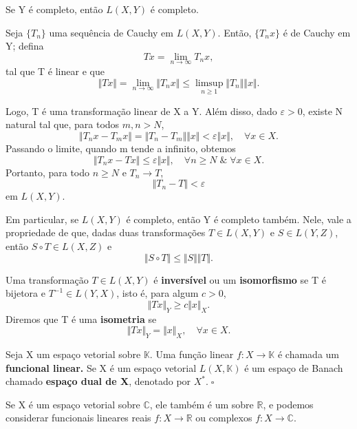 \documentclass[../functional_analysis.tex]{subfiles}
\begin{document}
\begin{prop*}
  Se Y é completo, então \(L(X, Y)\) é completo. 
\end{prop*}
\begin{proof*}
  Seja \(\{T_{n}\}\) uma sequência de Cauchy em \(L(X, Y)\). Então, \(\{T_{n}x\}\) é de Cauchy em Y; defina 
    \[
      Tx = \lim_{n\to \infty}T_{n}x,
    \]
    tal que T é linear e que 
      \[
        \Vert Tx \Vert=\lim_{n\to \infty}\Vert T_{n}x \Vert \leq \limsup_{n\geq 1}\Vert T_{n} \Vert \Vert x \Vert.
      \]

      Logo, T é uma transformação linear de X a Y. Além disso, dado \(\varepsilon >0\), existe N natural tal que, para todos \(m,n>N\), 
        \[
          \Vert T_{n}x - T_{m}x \Vert = \Vert T_{n}-T_{m} \Vert \Vert x \Vert < \varepsilon \Vert x \Vert,\quad \forall x\in X.
        \]
        Passando o limite, quando m tende a infinito, obtemos 
          \[
            \Vert T_{n}x - Tx \Vert \leq \varepsilon \Vert x \Vert,\quad \forall n\geq N\;\&\; \forall x\in X.
          \]
          Portanto, para todo \(n\geq N\) e \(T_{n}\rightarrow T\),
            \[
              \Vert T_{n}-T \Vert<\varepsilon 
            \]
            em \(L(X, Y)\). \qedsymbol
\end{proof*}
  Em particular, se \(L(X, Y)\) é completo, então Y é completo também. Nele, vale a propriedade de que, dadas duas transformações \(T\in L(X,Y)\) e \(S\in L(Y, Z)\), então \(S\circ T\in L(X, Z)\) e 
    \[
      \Vert S\circ T \Vert\leq \Vert S \Vert \Vert T \Vert.
    \]

   \begin{def*}
  Uma transformação \(T\in L(X, Y)\) é \textbf{inversível} ou um \textbf{isomorfismo} se T é bijetora e \(T^{-1}\in L(Y, X)\), isto é, para algum \(c>0\),
    \[
      \Vert Tx \Vert_{Y} \geq c \Vert x \Vert_{X}.
    \]    
    Diremos que T é uma \textbf{isometria} se 
      \[
        \Vert Tx \Vert_{Y} = \Vert x \Vert_{X},\quad \forall x\in X.
      \]
   \end{def*}
  \begin{def*}
    Seja X um espaço vetorial sobre \(\mathbb{K}.\) Uma função linear \(f:X\rightarrow \mathbb{K}\) é chamada um \textbf{funcional linear.}  Se X é um espaço vetorial \(L(X, \mathbb{K})\) é um espaço de Banach chamado \textbf{espaço dual de X}, denotado por \(X^{*}. \;\square\)
  \end{def*}
   \begin{tcolorbox}[
   skin=enhanced,
   title=Observação,
   fonttitle=\bfseries,
 colframe=black,
   colbacktitle=cyan!75!white, 
   colback=cyan!15,
   colbacklower=black,
 coltitle=black,
   drop fuzzy shadow,
   ]
   Se X é um espaço vetorial sobre \(\mathbb{C}\), ele também é um sobre \(\mathbb{R}\), e podemos considerar funcionais lineares reais \(f:X\rightarrow \mathbb{R}\) ou complexos \(f:X\rightarrow \mathbb{C}.\)
   \end{tcolorbox}
\end{document}
